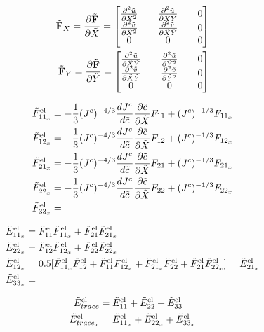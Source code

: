 \documentclass[../main.tex]{subfiles}
\begin{document}
\begin{align}
\td{\F}_X = \pdiff{ \td \F}{\tX} = 
\begin{bmatrix}
     \pdiff{ ^2 \td u}{\tX^2} && \pdiff{ ^2 \td u}{\tX \tY} && 0 \\
     \pdiff{ ^2 \td v}{ \tX^2} &&  \pdiff{ ^2 \td v}{ \tX \tY} && 0 \\
    0 && 0 && 0
\end{bmatrix}\\
\td{\F}_Y = \pdiff{ \td \F}{ \tY} = 
\begin{bmatrix}
    \pdiff{ ^2 \td u}{ \tX  \tY} && \pdiff{ ^2 \td u}{ \tY^2} && 0  \\
     \pdiff{ ^2 \td v}{ \tX   \tY} && \pdiff{ ^2 \td v}{  \tY^2} && 0 \\
    0 && 0 && 0
\end{bmatrix}
\end{align}

\begin{align}
    \tFel{11_x} &= -\fc{1}{3}(\jc)^{-4/3} \djc \tcx  F_{11} + (\jc)^{-1/3}F_{11_x} \\
    \tFel{12_x} &= -\fc{1}{3}(\jc)^{-4/3} \djc \tcx  F_{12} + (\jc)^{-1/3}F_{12_x}\\ 
    \tFel{21_x} &= -\fc{1}{3}(\jc)^{-4/3} \djc \tcx  F_{21} + (\jc)^{-1/3}F_{21_x}\\
    \tFel{22_x} &= -\fc{1}{3}(\jc)^{-4/3} \djc \tcx  F_{22} + (\jc)^{-1/3}F_{22_x}\\
    \tFel{33_x} &=
\end{align}

\begin{align}
    \tEel{11_x} &= \tFel{11} \tFel{11_x} + \tFel{21} \tFel{21_x} \\
    \tEel{22_x} &= \tFel{12} \tFel{12_x} + \tFel{22} \tFel{22_x} \\
    \tEel{12_x} &= 0.5[\tFel{11_x}\tFel{12} + \tFel{11}\tFel{12_x}  + \tFel{21_x}\tFel{22} + \tFel{21}\tFel{22_x}] = \tEel{21_x}\\
    \tEel{33_x} &= 
\end{align}

\begin{align}
    \tEel{trace} &= \tEel{11} + \tEel{22} + \tEel{33} \\
    \tEel{trace_x} &= \tEel{11_x} + \tEel{22_x} + \tEel{33_x} 
\end{align}
\end{document}

